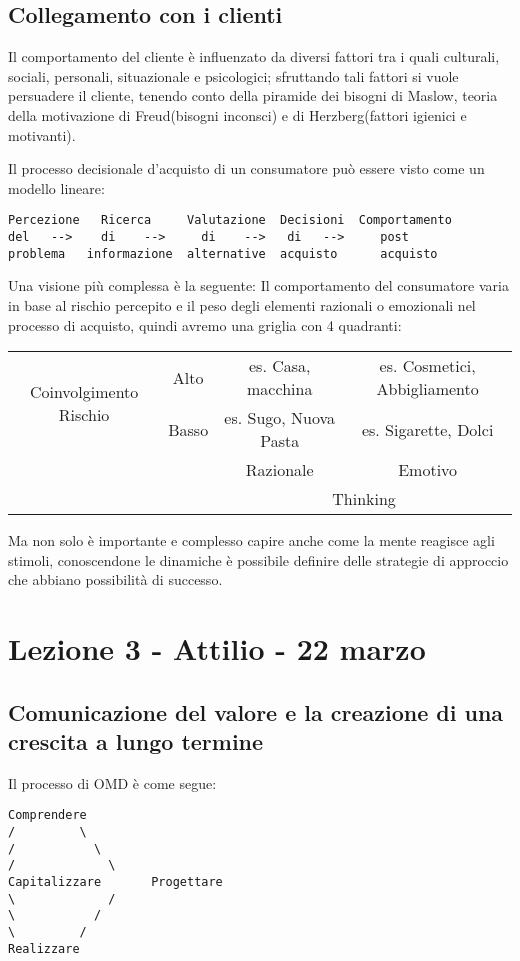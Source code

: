 \documentclass[11pt]{article}
\begin{document}
\subsection{Collegamento con i clienti}
Il comportamento del cliente è influenzato da diversi fattori tra i quali culturali, sociali, personali, situazionale e psicologici; sfruttando tali fattori si vuole persuadere il cliente, tenendo conto della piramide dei bisogni di Maslow, teoria della motivazione di Freud(bisogni inconsci) e di Herzberg(fattori igienici e motivanti).

Il processo decisionale d'acquisto di un consumatore può essere visto come un modello lineare:
\begin{verbatim}
Percezione   Ricerca     Valutazione  Decisioni  Comportamento
del   -->    di    -->     di    -->   di   -->     post
problema   informazione  alternative  acquisto      acquisto
\end{verbatim}

Una visione più complessa è la seguente: Il comportamento del consumatore varia in base al rischio percepito e il peso degli elementi razionali o emozionali nel processo di acquisto, quindi avremo una griglia con 4 quadranti:
\begin{table}
	\centering
	\begin{tabular}{|c|c|c|c|}
		\hline
		\multirow{2}{*}{Coinvolgimento Rischio}& Alto & es. Casa, macchina & es. Cosmetici, Abbigliamento\\ \cline{2-4}
											   & Basso & es. Sugo, Nuova Pasta & es. Sigarette, Dolci\\ \hline
											   & & Razionale & Emotivo\\ \cline{3-4}
											   & & \multicolumn{2}{c|}{Thinking}\\ \hline                                
	\end{tabular}
\end{table}
Ma non solo è importante e complesso capire anche come la mente reagisce agli stimoli, conoscendone le dinamiche è possibile definire delle strategie di approccio che abbiano possibilità di successo.

\section{Lezione 3 - Attilio - 22 marzo}

\subsection{Comunicazione del valore e la creazione di una crescita a lungo termine}
Il processo di OMD è come segue:
\begin{verbatim}
Comprendere
/         \
/           \
/             \ 
Capitalizzare       Progettare
\             /
\           /
\         /
Realizzare
\end{verbatim}
\end{document}
